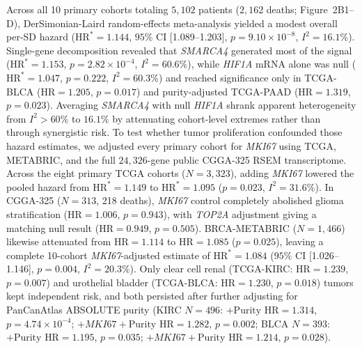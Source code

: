 \documentclass[10pt,twocolumn]{article}
\begin{document}
Across all 10 primary cohorts totaling $5,102$ patients ($2,162$ deaths; Figure~2B1--D), DerSimonian-Laird random-effects meta-analysis yielded a modest overall per-SD hazard ($\text{HR}^* = 1.144$, $95\%$ CI [1.089--1.203], $p = 9.10 \times 10^{-8}$, $I^2 = 16.1\%$). Single-gene decomposition revealed that \textit{SMARCA4} generated most of the signal ($\text{HR}^* = 1.153$, $p = 2.82 \times 10^{-4}$, $I^2 = 60.6\%$), while \textit{HIF1A} mRNA alone was null ($\text{HR}^* = 1.047$, $p = 0.222$, $I^2 = 60.3\%$) and reached significance only in TCGA-BLCA ($\text{HR} = 1.205$, $p = 0.017$) and purity-adjusted TCGA-PAAD ($\text{HR} = 1.319$, $p = 0.023$). Averaging \textit{SMARCA4} with null \textit{HIF1A} shrank apparent heterogeneity from $I^2 > 60\%$ to $16.1\%$ by attenuating cohort-level extremes rather than through synergistic risk. To test whether tumor proliferation confounded those hazard estimates, we adjusted every primary cohort for \textit{MKI67} using TCGA, METABRIC, and the full $24,326$-gene public CGGA-325 RSEM transcriptome. Across the eight primary TCGA cohorts ($N = 3,323$), adding \textit{MKI67} lowered the pooled hazard from $\text{HR}^* = 1.149$ to $\text{HR}^* = 1.095$ ($p = 0.023$, $I^2 = 31.6\%$). In CGGA-325 ($N = 313$, 218 deaths), \textit{MKI67} control completely abolished glioma stratification ($\text{HR} = 1.006$, $p = 0.943$), with \textit{TOP2A} adjustment giving a matching null result ($\text{HR} = 0.949$, $p = 0.505$). BRCA-METABRIC ($N = 1,466$) likewise attenuated from $\text{HR} = 1.114$ to $\text{HR} = 1.085$ ($p = 0.025$), leaving a complete 10-cohort \textit{MKI67}-adjusted estimate of $\text{HR}^* = 1.084$ ($95\%$ CI [1.026--1.146], $p = 0.004$, $I^2 = 20.3\%$). Only clear cell renal (TCGA-KIRC: $\text{HR} = 1.239$, $p = 0.007$) and urothelial bladder (TCGA-BLCA: $\text{HR} = 1.230$, $p = 0.018$) tumors kept independent risk, and both persisted after further adjusting for PanCanAtlas ABSOLUTE purity (KIRC $N = 496$: $+\text{Purity}$ $\text{HR} = 1.314$, $p = 4.74 \times 10^{-4}$; $+\textit{MKI67}+\text{Purity}$ $\text{HR} = 1.282$, $p = 0.002$; BLCA $N = 393$: $+\text{Purity}$ $\text{HR} = 1.195$, $p = 0.035$; $+\textit{MKI67}+\text{Purity}$ $\text{HR} = 1.214$, $p = 0.028$).
\end{document}
